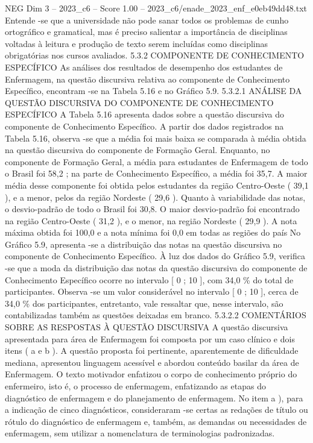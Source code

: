 \begin{textsample}{NEG Dim 3 – 2023\_c6 – Score 1.00 – 2023\_c6/enade\_2023\_enf\_e0eb49dd48.txt}
Entende -se que a universidade não pode sanar todos os problemas de cunho ortográfico e gramatical, mas é preciso salientar a importância de disciplinas voltadas à leitura e produção de texto serem incluídas como disciplinas obrigatórias nos cursos avaliados. 5.3.2 COMPONENTE DE CONHECIMENTO ESPECÍFICO As análises dos resultados de desempenho dos estudantes de Enfermagem, na questão discursiva relativa ao componente de Conhecimento Específico, encontram -se na Tabela 5.16 e no Gráfico 5.9. 5.3.2.1 ANÁLISE DA QUESTÃO DISCURSIVA DO COMPONENTE DE CONHECIMENTO ESPECÍFICO A Tabela 5.16 apresenta dados sobre a questão discursiva do componente de Conhecimento Específico.
A partir dos dados registrados na Tabela 5.16, observa -se que a média foi mais baixa se comparada à média obtida na questão discursiva do componente de Formação Geral.
Enquanto, no componente de Formação Geral, a média para estudantes de Enfermagem de todo o Brasil foi 58,2 ; na parte de Conhecimento Específico, a média foi 35,7.
A maior média desse componente foi obtida pelos estudantes da região Centro-Oeste ( 39,1 ), e a menor, pelos da região Nordeste ( 29,6 ).
Quanto à variabilidade das notas, o desvio-padrão de todo o Brasil foi 30,8.
O maior desvio-padrão foi encontrado na região Centro-Oeste ( 31,2 ), e o menor, na região Nordeste ( 29,9 ).
A nota máxima obtida foi 100,0 e a nota mínima foi 0,0 em todas as regiões do país No Gráfico 5.9, apresenta -se a distribuição das notas na questão discursiva no componente de Conhecimento Específico.
À luz dos dados do Gráfico 5.9, verifica -se que a moda da distribuição das notas da questão discursiva do componente de Conhecimento Específico ocorre no intervalo [ 0 ; 10 ], com 34,0 \% do total de participantes.
Observa -se um valor considerável no intervalo [ 0 ; 10 ], cerca de 34,0 \% dos participantes, entretanto, vale ressaltar que, nesse intervalo, são contabilizadas também as questões deixadas em branco. 5.3.2.2 COMENTÁRIOS SOBRE AS RESPOSTAS À QUESTÃO DISCURSIVA A questão discursiva apresentada para área de Enfermagem foi composta por um caso clínico e dois itens ( a e b ).
A questão proposta foi pertinente, aparentemente de dificuldade mediana, apresentou linguagem acessível e abordou conteúdo basilar da área de Enfermagem.
O texto motivador enfatizou o corpo de conhecimento próprio do enfermeiro, isto é, o processo de enfermagem, enfatizando as etapas do diagnóstico de enfermagem e do planejamento de enfermagem.
No item a ), para a indicação de cinco diagnósticos, consideraram -se certas as redações de título ou rótulo do diagnóstico de enfermagem e, também, as demandas ou necessidades de enfermagem, sem utilizar a nomenclatura de terminologias padronizadas.

\end{textsample}
